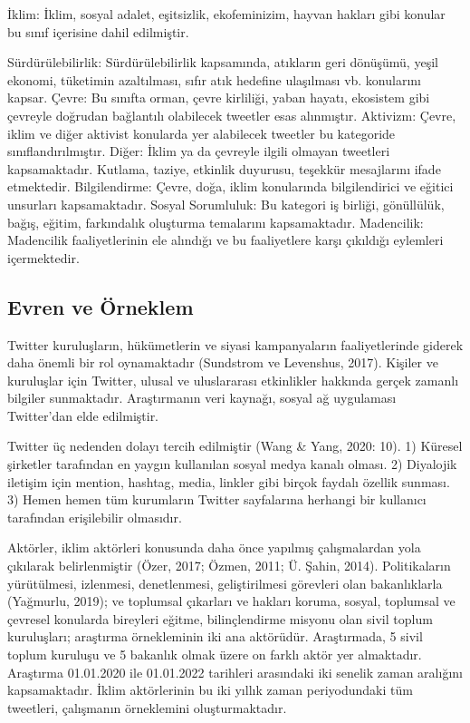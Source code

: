 \documentclass[
]{book}
\begin{document}
İklim: İklim, sosyal adalet, eşitsizlik, ekofeminizim, hayvan hakları gibi konular bu sınıf içerisine dahil edilmiştir.

Sürdürülebilirlik:
Sürdürülebilirlik kapsamında, atıkların geri dönüşümü, yeşil ekonomi, tüketimin azaltılması, sıfır atık hedefine ulaşılması vb. konularını kapsar.
Çevre: Bu sınıfta orman, çevre kirliliği, yaban hayatı, ekosistem gibi çevreyle doğrudan bağlantılı olabilecek tweetler esas alınmıştır.
Aktivizm: Çevre, iklim ve diğer aktivist konularda yer alabilecek tweetler bu kategoride sınıflandırılmıştır.
Diğer: İklim ya da çevreyle ilgili olmayan tweetleri kapsamaktadır. Kutlama, taziye, etkinlik duyurusu, teşekkür mesajlarını ifade etmektedir.
Bilgilendirme: Çevre, doğa, iklim konularında bilgilendirici ve eğitici unsurları kapsamaktadır.
Sosyal Sorumluluk: Bu kategori iş birliği, gönüllülük, bağış, eğitim, farkındalık oluşturma temalarını kapsamaktadır.
Madencilik: Madencilik faaliyetlerinin ele alındığı ve bu faaliyetlere karşı çıkıldığı eylemleri içermektedir.

\hypertarget{evren-ve-uxf6rneklem}{%
\subsection{Evren ve Örneklem}\label{evren-ve-uxf6rneklem}}

Twitter kuruluşların, hükümetlerin ve siyasi kampanyaların faaliyetlerinde giderek daha önemli bir rol oynamaktadır (Sundstrom ve Levenshus, 2017). Kişiler ve kuruluşlar için Twitter, ulusal ve uluslararası etkinlikler hakkında gerçek zamanlı bilgiler sunmaktadır. Araştırmanın veri kaynağı, sosyal ağ uygulaması Twitter'dan elde edilmiştir.

Twitter üç nedenden dolayı tercih edilmiştir (Wang \& Yang, 2020: 10).
1) Küresel şirketler tarafından en yaygın kullanılan sosyal medya kanalı olması.
2) Diyalojik iletişim için mention, hashtag, media, linkler gibi birçok faydalı özellik sunması.
3) Hemen hemen tüm kurumların Twitter sayfalarına herhangi bir kullanıcı tarafından erişilebilir olmasıdır.

Aktörler, iklim aktörleri konusunda daha önce yapılmış çalışmalardan yola çıkılarak belirlenmiştir (Özer, 2017; Özmen, 2011; Ü. Şahin, 2014). Politikaların yürütülmesi, izlenmesi, denetlenmesi, geliştirilmesi görevleri olan bakanlıklarla (Yağmurlu, 2019); ve toplumsal çıkarları ve hakları koruma, sosyal, toplumsal ve çevresel konularda bireyleri eğitme, bilinçlendirme misyonu olan sivil toplum kuruluşları; araştırma örnekleminin iki ana aktörüdür. Araştırmada, 5 sivil toplum kuruluşu ve 5 bakanlık olmak üzere on farklı aktör yer almaktadır. Araştırma 01.01.2020 ile 01.01.2022 tarihleri arasındaki iki senelik zaman aralığını kapsamaktadır. İklim aktörlerinin bu iki yıllık zaman periyodundaki tüm tweetleri, çalışmanın örneklemini oluşturmaktadır.
\end{document}
